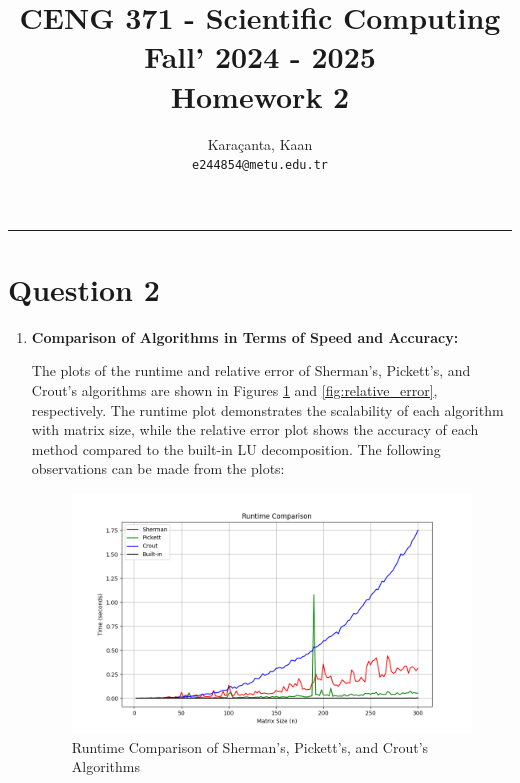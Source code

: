 \documentclass[11pt,a4paper, margin=1in]{article}
\author{
  Karaçanta, Kaan\\
  \texttt{e244854@metu.edu.tr}
}
\title{CENG 371 - Scientific Computing \\
Fall' 2024 - 2025 \\
Homework 2}
\date{}
\begin{document}
\maketitle

\noindent\rule{19cm}{1.2pt}

\section*{Question 2}

\begin{enumerate}

    \item \textbf{Comparison of Algorithms in Terms of Speed and Accuracy:}
    
    The plots of the runtime and relative error of Sherman's, Pickett's, and Crout's algorithms are shown in Figures \ref{fig:runtime} and \ref{fig:relative_error}, respectively. The runtime plot demonstrates the scalability of each algorithm with matrix size, while the relative error plot shows the accuracy of each method compared to the built-in LU decomposition. The following observations can be made from the plots:

    \begin{figure}[H]
        \centering
        \includegraphics[width=1\textwidth]{runtime_comparison.png}
        \caption{Runtime Comparison of Sherman's, Pickett's, and Crout's Algorithms}
        \label{fig:runtime}
    \end{figure}


\end{enumerate}
\end{document}
